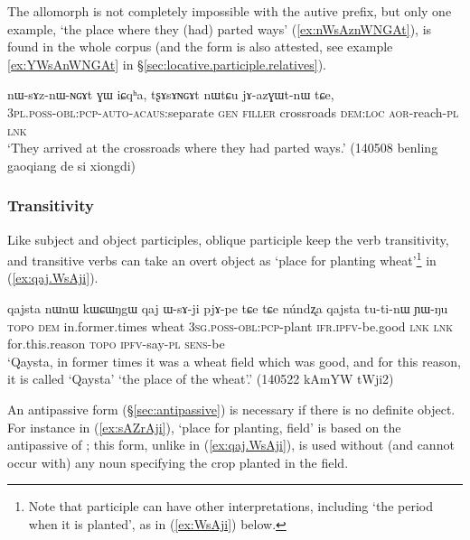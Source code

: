The  allomorph is not completely impossible with the autive  prefix, but only one example,  `the place where they (had) parted ways' (\ref{ex:nWsAznWNGAt}), is found in the whole corpus (and the form  is also attested, see example \ref{ex:YWsAnWNGAt} in §\ref{sec:locative.participle.relatives}).

\begin{exe}
\ex \label{ex:nWsAznWNGAt}
\gll  nɯ-sɤz-nɯ-ɴɢɤt ɣɯ iɕqʰa, tʂɤsɤɴɢɤt nɯtɕu jɤ-azɣɯt-nɯ tɕe, \\
\textsc{3pl}.\textsc{poss}-\textsc{obl}:\textsc{pcp}-\textsc{auto}-\textsc{acaus}:separate \textsc{gen} \textsc{filler}  crossroads \textsc{dem}:\textsc{loc} \textsc{aor}-reach-\textsc{pl} \textsc{lnk} \\
\glt `They arrived at the crossroads where they had parted ways.' (140508 benling gaoqiang de si xiongdi)
\end{exe} 

\subsubsection{Transitivity} \label{sec:oblique.participle.transitivity}
Like subject and object participles, oblique participle keep the verb transitivity, and transitive verbs can take an overt object as  `place for planting wheat'\footnote{Note that participle  can have other interpretations, including `the period when it is planted', as in (\ref{ex:WsAji}) below. } in (\ref{ex:qaj.WsAji}).

\begin{exe}
\ex \label{ex:qaj.WsAji}
\gll  qajsta nɯnɯ kɯɕɯŋgɯ qaj ɯ-sɤ-ji pjɤ-pe tɕe tɕe núndʐa qajsta tu-ti-nɯ ɲɯ-ŋu \\
\textsc{topo} \textsc{dem} in.former.times wheat \textsc{3sg}.\textsc{poss}-\textsc{obl}:\textsc{pcp}-plant \textsc{ifr}.\textsc{ipfv}-be.good \textsc{lnk} \textsc{lnk} for.this.reason  \textsc{topo} \textsc{ipfv}-say-\textsc{pl} \textsc{sens}-be \\
\glt `Qaysta, in former times it was a wheat field which was good, and for this reason, it is called `Qaysta' `the place of the wheat'.' (140522 kAmYW tWji2) 
\end{exe}

An antipassive form (§\ref{sec:antipassive}) is necessary if there is no definite object. For instance in (\ref{ex:sAZrAji}),  `place for planting, field' is based on the  antipassive of ; this form, unlike  in (\ref{ex:qaj.WsAji}), is used without (and cannot occur with) any noun specifying the crop planted in the field.


